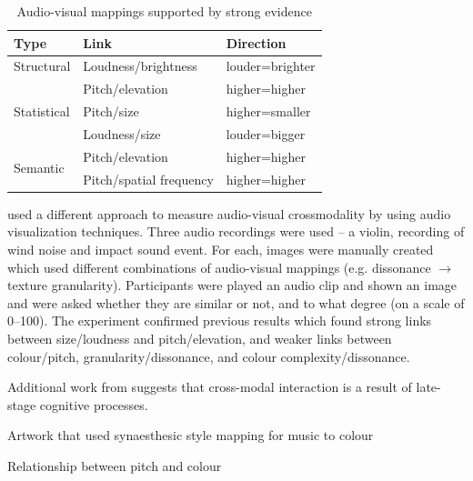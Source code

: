 \begin{table}
\centering
\begin{tabular}{|l|l|l|}
\hline
\textbf{Type} & \textbf{Link} & \textbf{Direction} \\ \hline
Structural    & Loudness/brightness  & louder=brighter \\ \hline
\multirow{3}{*}{Statistical} & Pitch/elevation & higher=higher \\ \cline{2-3}
              & Pitch/size & higher=smaller \\ \cline{2-3}
              & Loudness/size & louder=bigger \\ \hline
\multirow{2}{*}{Semantic} & Pitch/elevation & higher=higher \\ \cline{2-3}
              & Pitch/spatial frequency & higher=higher \\ \hline
\end{tabular}
\caption{Audio-visual mappings supported by strong evidence \citep{Spence2011}}
\label{tab:crossmodal}
\end{table}

\citet{Tsiros2014} used a different approach to measure audio-visual crossmodality by using audio visualization
techniques.  Three audio recordings were used -- a violin, recording of wind noise and impact sound event. For each,
images were manually created which used different combinations of audio-visual mappings (e.g. dissonance $\to$ texture
granularity). Participants were played an audio clip and shown an image and were asked whether they are similar or not,
and to what degree (on a scale of 0--100).  The experiment confirmed previous results which found strong links between
size/loudness and pitch/elevation, and weaker links between colour/pitch, granularity/dissonance, and colour
complexity/dissonance.

Additional work from \citet{Marks2003} suggests that cross-modal interaction is a result of late-stage cognitive
processes.

Artwork that used synaesthesic style mapping for music to colour \citep{Armitage2012}

Relationship between pitch and colour \citep{Datteri2004}

